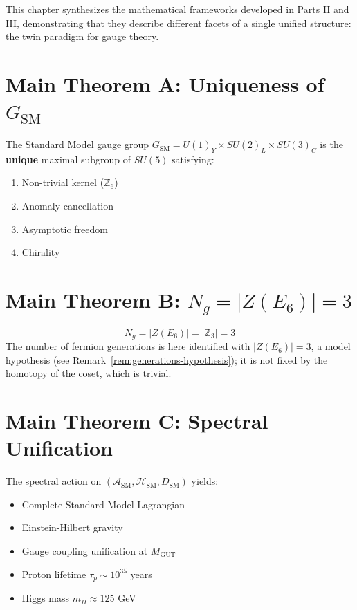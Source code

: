 \documentclass[11pt,a4paper,openright]{book}
\theoremstyle{plain}
\theoremstyle{definition}
\newcommand{\Hil}{\mathcal{H}}
\newcommand{\A}{\mathcal{A}}
\newcommand{\SM}{\mathrm{SM}}
\newcommand{\Z}{\mathbb{Z}}
\newcommand{\MGUT}{M_{\mathrm{GUT}}}
\begin{document}
This chapter synthesizes the mathematical frameworks developed in Parts II and III, demonstrating that they describe different facets of a single unified structure: the twin paradigm for gauge theory.

\section{Main Theorem A: Uniqueness of $G_{\SM}$}

\begin{mainresult}[Uniqueness]
The Standard Model gauge group $G_{\SM} = U(1)_Y \times SU(2)_L \times SU(3)_C$ is the \textbf{unique} maximal subgroup of $SU(5)$ satisfying:
\begin{enumerate}
    \item Non-trivial kernel ($\Z_6$)
    \item Anomaly cancellation
    \item Asymptotic freedom
    \item Chirality
\end{enumerate}
\end{mainresult}

\section{Main Theorem B: $N_g = |Z(E_6)| = 3$}

\begin{mainresult}
\begin{equation}
\boxed{N_g = |Z(E_6)| = |\Z_3| = 3}
\end{equation}
The number of fermion generations is here identified with $|Z(E_6)| = 3$, a model hypothesis (see Remark~\ref{rem:generations-hypothesis}); it is not fixed by the homotopy of the coset, which is trivial.
\end{mainresult}

\section{Main Theorem C: Spectral Unification}

\begin{mainresult}
The spectral action on $(\A_{\SM}, \Hil_{\SM}, D_{\SM})$ yields:
\begin{itemize}
    \item Complete Standard Model Lagrangian
    \item Einstein-Hilbert gravity
    \item Gauge coupling unification at $\MGUT$
    \item Proton lifetime $\tau_p \sim 10^{35}$ years
    \item Higgs mass $m_H \approx 125$ GeV
\end{itemize}
\end{mainresult}
\end{document}
